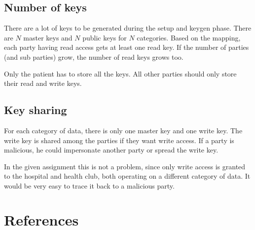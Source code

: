 \documentclass[a4paper]{article}
\begin{document}
	\subsection{Number of keys}
		There are a lot of keys to be generated during the setup and keygen phase. There are $N$ master keys and $N$ public keys for $N$ categories. Based on the mapping, each party having read access gets at least one read key. If the number of parties (and sub parties) grow, the number of read keys grows too.
		
		Only the patient has to store all the keys. All other parties should only store their read and write keys.
	
	\subsection{Key sharing}
		For each category of data, there is only one master key and one write key. The write key is shared among the parties if they want write access. If a party is malicious, he could impersonate another party or spread the write key. 
		
		In the given assignment this is not a problem, since only write access is granted to the hospital and health club, both operating on a different category of data. It would be very easy to trace it back to a malicious party.

\section{References}
	
	
\end{document}
